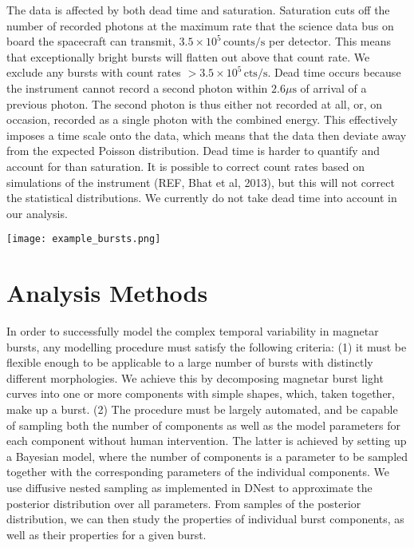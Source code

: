 \documentclass[12pt]{emulateapj}
\newcommand{\project}[1]{\textsl{#1}}
\newcommand{\RXTE}{\project{RXTE}}
\newcommand{\counts}{y}
\begin{document}
The data is affected by both dead time and saturation. Saturation cuts off the number of recorded photons at the maximum rate
that the science data bus on board the spacecraft can transmit, $3.5 \times 10^{5} \, \mathrm{counts}/\mathrm{s}$ per detector. This means
that exceptionally bright bursts will flatten out above that count rate. We exclude any bursts with count rates $>3.5\times10^{5} \, \mathrm{cts}/\mathrm{s}$.
Dead time occurs because the instrument cannot record a second photon within $2.6\mu\mathrm{s}$ of arrival of a previous photon. 
The second photon is thus either not recorded at all, or, on occasion, recorded as a single photon with the combined energy. This effectively 
imposes a time scale onto the data, which means that the data then deviate away from the expected Poisson distribution. 
Dead time is harder to quantify and account for than saturation. It is possible to correct count rates based on simulations of the instrument (REF, Bhat et al, 2013),
but this will not correct the statistical distributions. We currently do not take dead time into account in our analysis. 




\begin{figure*}[h]
\begin{center}
\texttt{[image: example\_bursts.png]}
\caption{}
\label{fig:example_bursts}
\end{center}
\end{figure*}

\section{Analysis Methods}

In order to successfully model the complex temporal variability in magnetar bursts, any modelling procedure must satisfy the following criteria: (1) it must be flexible enough to be applicable to a large number of bursts with distinctly different morphologies. We achieve this by decomposing magnetar burst light curves into one or more components with simple shapes, which, taken together, make up a burst. (2) The procedure must be largely automated, and be capable of sampling both the number of components as well as the model parameters for each component without human intervention. The latter is achieved by setting up a Bayesian model, where the number of components is a parameter to be sampled together with the corresponding parameters of the individual components. We use diffusive nested sampling as implemented in DNest \citep{brewer2011} to approximate the posterior distribution over all parameters. From samples of the posterior distribution,
we can then study the properties of individual burst components, as well as their properties for a given burst.
\end{document}
